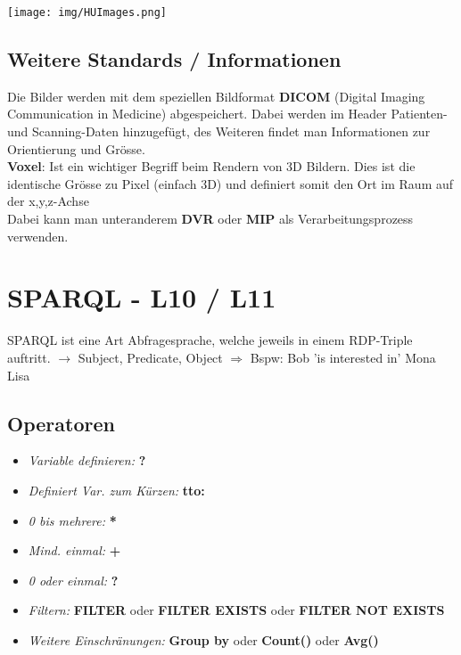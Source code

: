 \documentclass{report}
\newenvironment{Figure}
	{\par\medskip\noindent\minipage{\linewidth}}
	{\endminipage\par\medskip}
\theoremstyle{definition}
\theoremstyle{example}
\begin{document}
\begin{Figure}
   \centering
   \texttt{[image: img/HUImages.png]}
      \label{fig:Beispielbilder unterschiedlicher HU}
\end{Figure}

\section{Weitere Standards / Informationen}
Die Bilder werden mit dem speziellen Bildformat \textbf{DICOM} (Digital Imaging Communication in Medicine) abgespeichert. Dabei werden im Header Patienten- und Scanning-Daten hinzugefügt, des Weiteren findet man Informationen zur Orientierung und Grösse.\\
\textbf{Voxel}: Ist ein wichtiger Begriff beim Rendern von 3D Bildern. Dies ist die identische Grösse zu Pixel (einfach 3D) und definiert somit den Ort im Raum auf der x,y,z-Achse\\
Dabei kann man unteranderem \textbf{DVR} oder \textbf{MIP} als Verarbeitungsprozess verwenden.


\chapter{SPARQL - L10 / L11}
SPARQL ist eine Art Abfragesprache, welche jeweils in einem RDP-Triple auftritt. $\rightarrow$ Subject, Predicate, Object $\Rightarrow$ Bspw: Bob 'is interested in' Mona Lisa

\section{Operatoren}

\begin{itemize}
   \item \textit{Variable definieren:} \textbf{?}
   \item \textit{Definiert Var. zum Kürzen:} \textbf{tto:}
   \item \textit{0 bis mehrere:} \textbf{*}
   \item \textit{Mind. einmal:} \textbf{+}
   \item \textit{0 oder einmal:} \textbf{?}
   \item \textit{Filtern:} \textbf{FILTER} oder \textbf{FILTER EXISTS} oder \textbf{FILTER NOT EXISTS}
   \item \textit{Weitere Einschränungen:} \textbf{Group by} oder \textbf{Count()} oder \textbf{Avg()}
\end{itemize}
\end{document}
